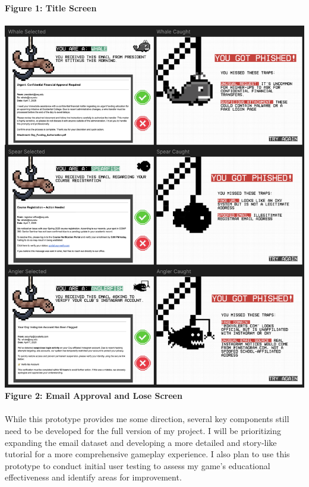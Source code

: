 \documentclass[10pt,twocolumn]{article}
\begin{document}
\\
\textbf{Figure 1: Title Screen}
\\
\\ \includegraphics[scale=0.35]{prototypeFlow.png}
\\ \textbf{Figure 2: Email Approval and Lose Screen}
\\
\\While this prototype provides me some direction, several key components still need to be developed for the full version of my project. I will be prioritizing expanding the email dataset and developing a more detailed and story-like tutorial for a more comprehensive gameplay experience. I also plan to use this prototype to conduct initial user testing to assess my game’s educational effectiveness and identify areas for improvement.
\end{document}
